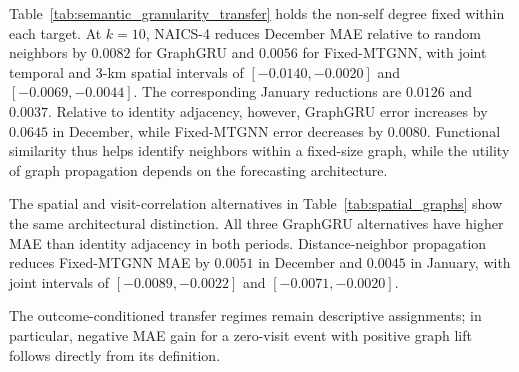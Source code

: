 Table~\ref{tab:semantic_granularity_transfer} holds the non-self degree fixed within each target. At $k=10$, NAICS-4 reduces December MAE relative to random neighbors by $0.0082$ for GraphGRU and $0.0056$ for Fixed-MTGNN, with joint temporal and 3-km spatial intervals of $[-0.0140,-0.0020]$ and $[-0.0069,-0.0044]$. The corresponding January reductions are $0.0126$ and $0.0037$. Relative to identity adjacency, however, GraphGRU error increases by $0.0645$ in December, while Fixed-MTGNN error decreases by $0.0080$. Functional similarity thus helps identify neighbors within a fixed-size graph, while the utility of graph propagation depends on the forecasting architecture.



The spatial and visit-correlation alternatives in Table~\ref{tab:spatial_graphs} show the same architectural distinction. All three GraphGRU alternatives have higher MAE than identity adjacency in both periods. Distance-neighbor propagation reduces Fixed-MTGNN MAE by $0.0051$ in December and $0.0045$ in January, with joint intervals of $[-0.0089,-0.0022]$ and $[-0.0071,-0.0020]$.



The outcome-conditioned transfer regimes remain descriptive assignments; in particular, negative MAE gain for a zero-visit event with positive graph lift follows directly from its definition.
